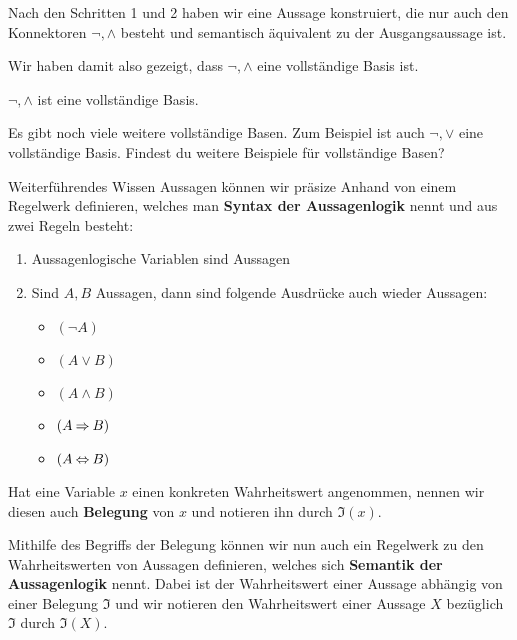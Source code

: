 \documentclass[../../main.tex]{subfiles}
\begin{document}
    Nach den Schritten 1 und 2 haben wir eine Aussage konstruiert, die nur auch 
    den Konnektoren $\lnot,\land$ besteht und semantisch äquivalent zu der 
    Ausgangsaussage ist.

    Wir haben damit also gezeigt, dass $\lnot,\land$ eine vollständige Basis ist.

    \begin{theorem}{}
    $\lnot,\land$ ist eine vollständige Basis.
    \end{theorem}

    Es gibt noch viele weitere vollständige Basen. Zum Beispiel ist auch 
    $\lnot,\lor$ eine vollständige Basis. Findest du 
    weitere Beispiele für vollständige Basen?

    \begin{nutshell}{Weiterführendes Wissen}
    Aussagen können wir präsize Anhand von einem Regelwerk definieren, welches 
    man \textbf{Syntax der Aussagenlogik} nennt und aus zwei Regeln besteht:
    \begin{enumerate}

        \item Aussagenlogische Variablen sind Aussagen 
        \item Sind $A,B$ Aussagen, dann sind folgende Ausdrücke auch wieder Aussagen:
            \begin{itemize}
                \item $(\lnot A)$
                \item $(A \lor B)$
                \item $(A \land B)$
                \item $(A \mathbin{\Rightarrow} B)$
                \item $(A \mathbin{\Leftrightarrow} B)$
            \end{itemize}

    \end{enumerate}

    Hat eine Variable $x$ einen konkreten Wahrheitswert angenommen, 
    nennen wir diesen auch \textbf{Belegung} von $x$ und notieren ihn 
    durch $\mathfrak{I}(x)$.

    Mithilfe des Begriffs der Belegung können wir nun auch ein Regelwerk zu 
    den Wahrheitswerten von Aussagen definieren, welches sich 
    \textbf{Semantik der Aussagenlogik} nennt. Dabei ist der Wahrheitswert 
    einer Aussage abhängig von einer Belegung $\mathfrak{I}$ und wir notieren 
    den Wahrheitswert einer Aussage $X$ bezüglich $\mathfrak{I}$ 
    durch $\mathfrak{I}(X)$.


\end{nutshell}
\end{document}
